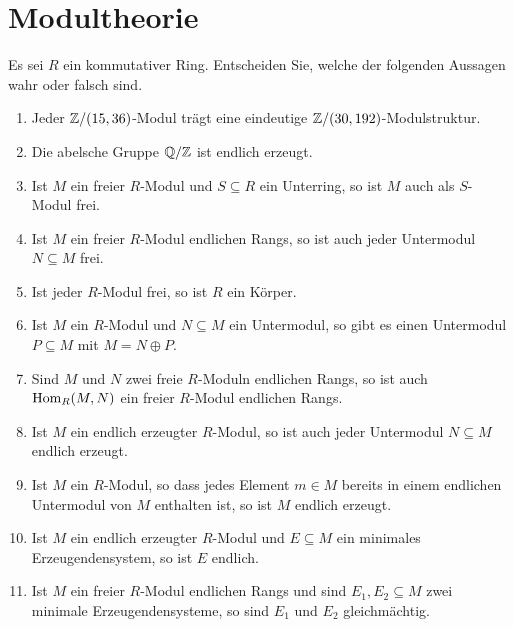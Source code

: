\section{Modultheorie}




\begin{question}[subtitle = Multiple Choice]
  Es sei $R$ ein kommutativer Ring.
  Entscheiden Sie, welche der folgenden Aussagen wahr oder falsch sind.
  \begin{enumerate}
    \item
      Jeder $\mathbb{Z}/(15,36)$-Modul trägt eine eindeutige $\mathbb{Z}/(30,192)$-Modulstruktur.
    \item
      Die abelsche Gruppe $\mathbb{Q}/\mathbb{Z}$ ist endlich erzeugt.
    \item
      Ist $M$ ein freier $R$-Modul und $S \subseteq R$ ein Unterring, so ist $M$ auch als $S$-Modul frei.
    \item
      Ist $M$ ein freier $R$-Modul endlichen Rangs, so ist auch jeder Untermodul $N \subseteq M$ frei.
    \item
      Ist jeder $R$-Modul frei, so ist $R$ ein Körper.
    \item
      Ist $M$ ein $R$-Modul und $N \subseteq M$ ein Untermodul, so gibt es einen Untermodul $P \subseteq M$ mit $M = N \oplus P$.
    \item
      Sind $M$ und $N$ zwei freie $R$-Moduln endlichen Rangs, so ist auch $\operatorname{Hom}_R(M, N)$ ein freier $R$-Modul endlichen Rangs.
    \item
      Ist $M$ ein endlich erzeugter $R$-Modul, so ist auch jeder Untermodul $N \subseteq M$ endlich erzeugt.
    \item
      Ist $M$ ein $R$-Modul, so dass jedes Element $m \in M$ bereits in einem endlichen Untermodul von $M$ enthalten ist, so ist $M$ endlich erzeugt.
    \item
      Ist $M$ ein endlich erzeugter $R$-Modul und $E \subseteq M$ ein minimales Erzeugendensystem, so ist $E$ endlich.
    \item
      Ist $M$ ein freier $R$-Modul endlichen Rangs und sind $E_1, E_2 \subseteq M$ zwei minimale Erzeugendensysteme, so sind $E_1$ und $E_2$ gleichmächtig.

\end{enumerate}
\end{question}
